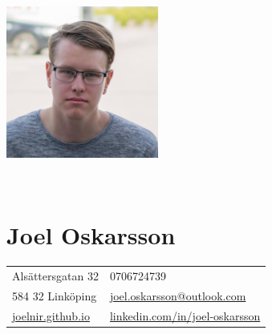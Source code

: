\documentclass[12pt]{article}
\newcommand{\text}[2]{#2}
\newcommand{\text}[2]{#1}
\begin{document}
\begin{figure}
    \begin{subfigure}[]{0.4\textwidth}
        \includegraphics[height=5cm]{photo}
    \end{subfigure}%
    ~
    \begin{subfigure}[]{0.5\textwidth}
        \part*{Joel Oskarsson}

        \begin{tabular}{l l}
            Alsättersgatan 32 & \text{+46706724739}{0706724739}\\
            584 32 Linköping & \href{mailto:joel.oskarsson@outlook.com}{joel.oskarsson@outlook.com}\\
            \href{http://joelnir.github.io}{joelnir.github.io} & \href{http://linkedin.com/in/joel-oskarsson}{linkedin.com/in/joel-oskarsson}
        \end{tabular}

     \end{subfigure}%
\end{figure}
\end{document}
